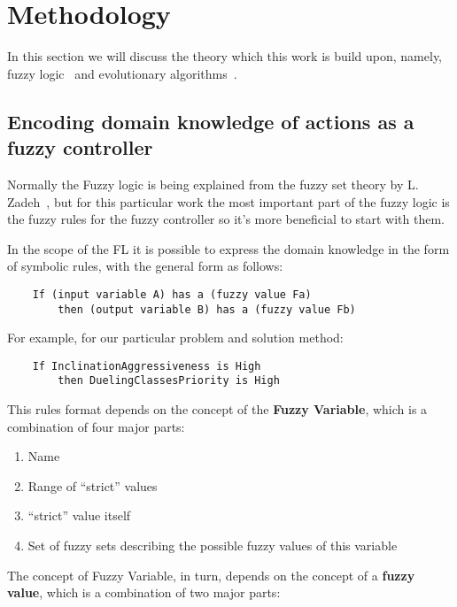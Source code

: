 \documentclass[11pt, a4paper]{article}
\begin{document}
	\section{Methodology}\label{methodology}

  In this section we will discuss the theory which this work is build upon, namely, fuzzy logic~\cite{ray2014softcomputing} and evolutionary algorithms~\cite{mitchell1999geneticalgorithms}.

	\subsection{Encoding domain knowledge of actions as a fuzzy controller}

  Normally the Fuzzy logic is being explained from the fuzzy set theory by L. Zadeh~\cite{zadehFSbase}, but for this particular work the most important part of the fuzzy logic is the fuzzy rules for the fuzzy controller so it's more beneficial to start with them.

  In the scope of the FL it is possible to express the domain knowledge in the form of symbolic rules, with the general form as follows:

  \begin{verbatim}
    If (input variable A) has a (fuzzy value Fa) 
    	then (output variable B) has a (fuzzy value Fb)
  \end{verbatim}

  For example, for our particular problem and solution method:

  \begin{verbatim}
    If InclinationAggressiveness is High 
    	then DuelingClassesPriority is High
  \end{verbatim}

  This rules format depends on the concept of the \textbf{Fuzzy Variable}, which is a combination of four major parts:

  \begin{enumerate}
    \item Name
    \item Range of ``strict'' values
    \item ``strict'' value itself
    \item Set of fuzzy sets describing the possible fuzzy values of this variable
  \end{enumerate}

  The concept of Fuzzy Variable, in turn, depends on the concept of a \textbf{fuzzy value}, which is a combination of two major parts:
\end{document}
